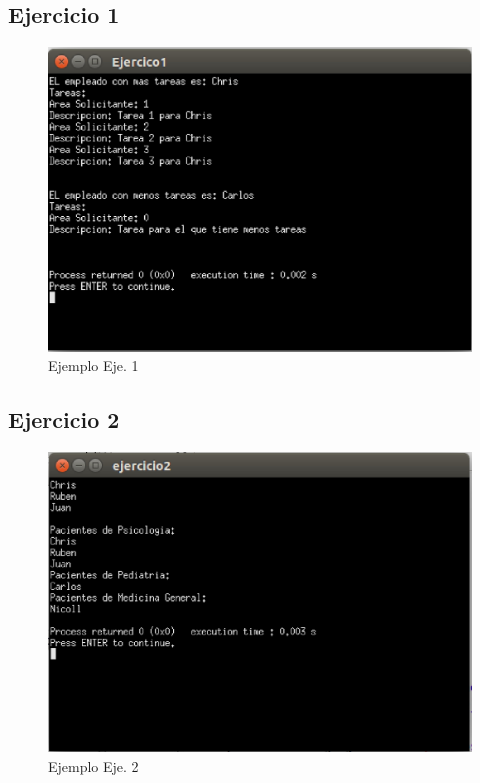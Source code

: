 \documentclass[a4paper,12pt]{article}
\begin{document}
 \subsection{Ejercicio 1}
 \begin{figure}[h]
  \centering
  \includegraphics[scale = 0.5]{1.eps}
  \caption{Ejemplo Eje. 1}
 \end{figure}
 \subsection{Ejercicio 2}
 \begin{figure}[h]
  \centering
  \includegraphics[scale = 0.5]{2.eps}
  \caption{Ejemplo Eje. 2}
 \end{figure}





 

 
\end{document}
